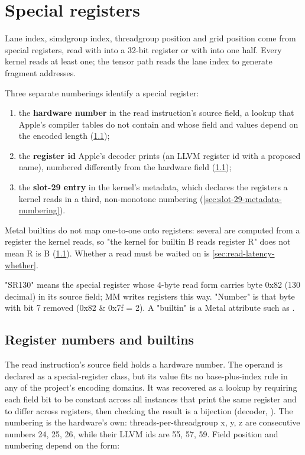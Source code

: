 \chapter{Special registers}\label{ch:special-registers}

Lane index, simdgroup index, threadgroup position and grid position come from special registers, read with
 into a 32-bit register or with  into one half.
Every kernel reads at least one; the tensor path reads the lane index to generate fragment addresses.

Three separate numberings identify a special register:

\begin{enumerate}
\def\labelenumi{\arabic{enumi}.}
\item the \textbf{hardware number} in the read instruction's source field, a lookup that Apple's compiler tables do not contain and
  whose field and values depend on the encoded length (\cref{sec:special-registers});
\item the \textbf{register id} Apple's decoder prints (an LLVM register id with a proposed  name), numbered
  differently from the hardware field (\cref{sec:special-registers});
\item the \textbf{slot-29 entry} in the kernel's metadata, which declares the registers a kernel reads in a third,
  non-monotone numbering (\cref{sec:slot-29-metadata-numbering}).
\end{enumerate}

Metal builtins do not map one-to-one onto registers: several are computed from a register the kernel reads, so "the
kernel for builtin B reads register R" does not mean R is B (\cref{sec:special-registers}). Whether a read must be waited on is
\cref{sec:read-latency-whether}.

"SR130" means the special register whose 4-byte read form carries byte 0x82 (130 decimal) in its
source field; MM writes registers this way. "Number" is that byte with bit 7 removed (0x82 \& 0x7f = 2). A "builtin" is a
Metal attribute such as .

\section{Register numbers and builtins}\label{sec:special-registers}

The read instruction's source field holds a hardware number. The operand is declared as a special-register
class, but its value fits no base-plus-index rule in any of the project's encoding domains. It was recovered as a lookup by
requiring each field bit to be constant across all instances that print the same register and to differ across registers,
then checking the result is a bijection (decoder, ). The numbering is the
hardware's own: threads-per-threadgroup x, y, z are consecutive numbers 24, 25, 26, while their LLVM
ids are 55, 57, 59. Field position and numbering depend on the form:

